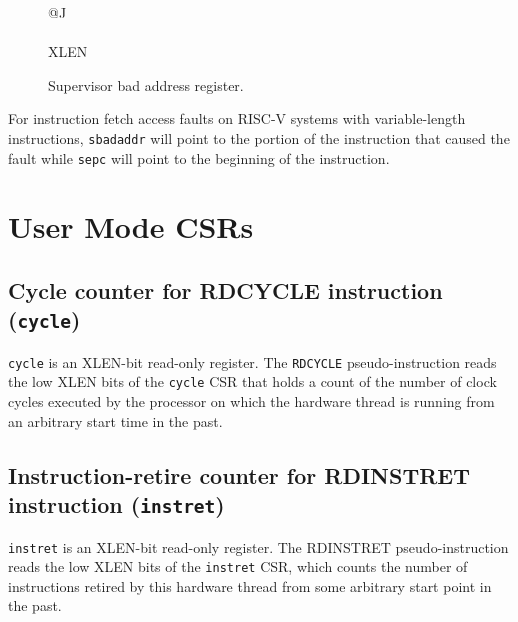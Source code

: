 \ifdefined\MARKDOWN
\else

\begin{figure}[htb]
	{\footnotesize
		\begin{center}
			\begin{tabular}{@{}J}
				 \\
				\hline
				 \\
				\hline
				XLEN \\
			\end{tabular}
		\end{center}
	}
	\vspace{-0.1in}
	\caption{Supervisor bad address register.}
	\label{badvaddrreg}
\end{figure}

\fi

For instruction fetch access faults on RISC-V systems with variable-length
instructions, \texttt{sbadaddr} will point to the portion of the instruction
that caused the fault while \texttt{sepc} will point to the beginning of the
instruction.

\pagebreak

\section{User Mode CSRs}\label{user-mode-csrs}

\subsection{Cycle counter for RDCYCLE instruction (\texttt{cycle})} \label{cycle-counter-for-rdcycle-instruction-cycle}

\texttt{cycle} is an XLEN-bit read-only register. The \texttt{RDCYCLE} pseudo-instruction
reads the low XLEN bits of the \texttt{cycle} CSR that holds a count of the
number of clock cycles executed by the processor on which the hardware
thread is running from an arbitrary start time in the past.

\subsection{Instruction-retire counter for RDINSTRET instruction
(\texttt{instret})}\label{instruction-retire-counter-for-rdinstret-instruction-instret}

\texttt{instret} is an XLEN-bit read-only register. The RDINSTRET
pseudo-instruction reads the low XLEN bits of the \texttt{instret} CSR, which
counts the number of instructions retired by this hardware thread from
some arbitrary start point in the past.

